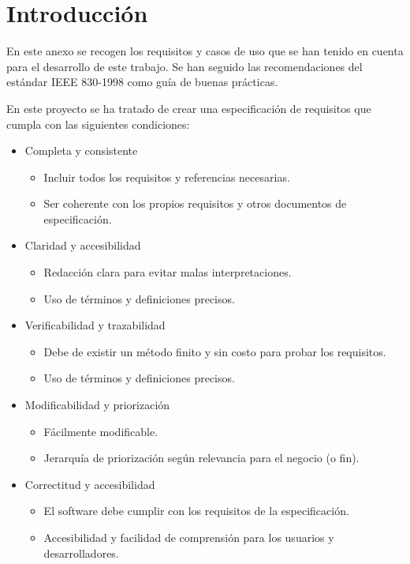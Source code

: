 
\section{Introducción}

En este anexo se recogen los requisitos y casos de uso que se han tenido en cuenta para el desarrollo de este trabajo. Se han seguido las recomendaciones del estándar IEEE 830-1998\citep{1998IEEESpecifications} como guía de buenas prácticas.

En este proyecto se ha tratado de crear una especificación de requisitos que cumpla con las siguientes condiciones:

\begin{itemize}
\tightlist
\item
	Completa y consistente
	\begin{itemize}
	\item 
	Incluir todos los requisitos y referencias necesarias.
	\item
	Ser coherente con los propios requisitos y otros documentos de especificación.
	\end{itemize}
\item
	Claridad y accesibilidad
	\begin{itemize}
	\item 
	Redacción clara para evitar malas interpretaciones.
	\item
	Uso de términos y definiciones precisos.
	\end{itemize}
\item
	Verificabilidad y trazabilidad
	\begin{itemize}
	\item 
	Debe de existir un método finito y sin costo para probar los requisitos.
	\item
	Uso de términos y definiciones precisos.
	\end{itemize}
\item
	Modificabilidad y priorización
	\begin{itemize}
	\item 
	Fácilmente modificable.
	\item
	Jerarquía de priorización según relevancia para el negocio (o fin).
	\end{itemize}
\item
	Correctitud y accesibilidad
	\begin{itemize}
	\item 
	El software debe cumplir con los requisitos de la especificación.
	\item
	Accesibilidad y facilidad de comprensión para los usuarios y desarrolladores.
	\end{itemize}
\end{itemize}


